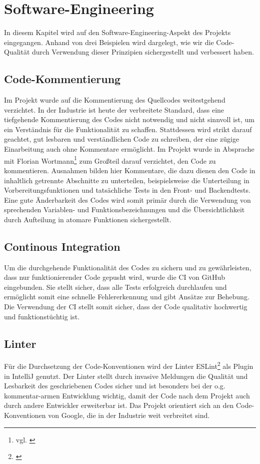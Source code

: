 \section{Software-Engineering}
In diesem Kapitel wird auf den Software-Engineering-Aspekt des Projekts eingegangen. Anhand von drei Beispielen wird dargelegt, wie wir die Code-Qualität durch Verwendung dieser Prinzipien sichergestellt und verbessert haben.
\subsection*{Code-Kommentierung}
Im Projekt wurde auf die Kommentierung des Quellcodes weitestgehend verzichtet.
In der Industrie ist heute der verbreitete Standard, dass eine tiefgehende Kommentierung des Codes nicht notwendig und nicht sinnvoll ist, um ein Verständnis für die Funktionalität zu schaffen.
Stattdessen wird strikt darauf geachtet, gut lesbaren und verständlichen Code zu schreiben, der eine zügige Einarbeitung auch ohne Kommentare ermöglicht.
Im Projekt wurde in Absprache mit Florian Wortmann\footnote{vgl. \cite{BesprNotiz.2020}} zum Großteil darauf verzichtet, den Code zu kommentieren.
Ausnahmen bilden hier Kommentare, die dazu dienen den Code in inhaltlich getrennte Abschnitte zu unterteilen, beispielsweise die Unterteilung in Vorbereitungsfunktionen und tatsächliche Tests in den Front- und Backendtests.
Eine gute Änderbarkeit des Codes wird somit primär durch die Verwendung von sprechenden Variablen- und Funktionsbezeichnungen und die Übersichtlichkeit durch Aufteilung in atomare Funktionen sichergestellt.
\subsection*{Continous Integration}
Um die durchgehende Funktionalität des Codes zu sichern und zu gewährleisten, dass nur funktionierender Code gepusht wird, wurde die CI von GitHub eingebunden.
Sie stellt sicher, dass alle Tests erfolgreich durchlaufen und ermöglicht somit eine schnelle Fehlererkennung und gibt Ansätze zur Behebung.
Die Verwendung der CI stellt somit sicher, dass der Code qualitativ hochwertig und funktionstüchtig ist.
\subsection*{Linter}
Für die Durchsetzung der Code-Konventionen wird der Linter ESLint\footnote{\cite{ESLint.2020}} als Plugin in IntelliJ genutzt.
Der Linter stellt durch invasive Meldungen die Qualität und Lesbarkeit des geschriebenen Codes sicher und ist besonders bei der o.g. kommentar-armen Entwicklung wichtig, damit der Code nach dem Projekt auch durch andere Entwickler erweiterbar ist.
Das Projekt orientiert sich an den Code-Konventionen von Google, die in der Industrie weit verbreitet sind.